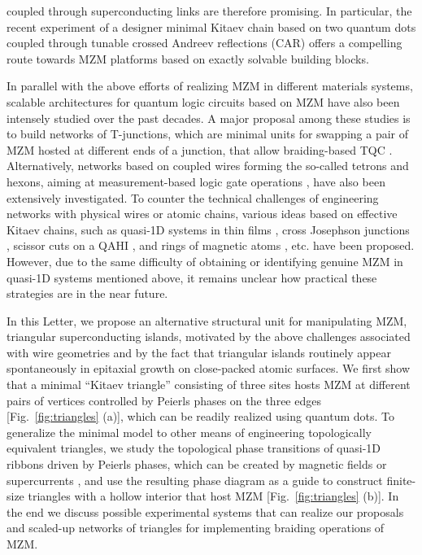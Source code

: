 \documentclass[aps,prb,showpacs,amsmath,twocolumn,amssymb,superscriptaddress]{revtex4-2}
\begin{document}
coupled through superconducting links \cite{sauRealizingRobustPractical2012,leijnseParityQubitsPoor2012,dvirRealizationMinimalKitaev2023} are therefore promising. In particular, the recent experiment \cite{dvirRealizationMinimalKitaev2023} of a designer minimal Kitaev chain based on two quantum dots coupled through tunable crossed Andreev reflections (CAR) offers a compelling route towards MZM platforms based on exactly solvable building blocks.

In parallel with the above efforts of realizing MZM in different materials systems, scalable architectures for quantum logic circuits based on MZM have also been intensely studied over the past decades. A major proposal among these studies is to build networks of T-junctions, which are minimal units for swapping a pair of MZM hosted at different ends of a junction, that allow braiding-based TQC \cite{aasenMilestonesMajoranaBasedQuantum2016}. Alternatively, networks based on coupled wires forming the so-called tetrons and hexons, aiming at measurement-based logic gate operations  \cite{karzigScalableDesignsQuasiparticlepoisoningprotected2017}, have also been extensively investigated. To counter the technical challenges of engineering networks with physical wires or atomic chains, various ideas based on effective Kitaev chains, such as quasi-1D systems in thin films \cite{potterMultichannelGeneralizationKitaev2010}, cross Josephson junctions \cite{zhouPhaseControlMajorana2020}, scissor cuts on a QAHI \cite{xieCreatingLocalizedMajorana2021}, and rings of magnetic atoms \cite{liManipulatingMajoranaZero2016}, etc. have been proposed. However, due to the same difficulty of obtaining or identifying genuine MZM in quasi-1D systems mentioned above, it remains unclear how practical these strategies are in the near future.

In this Letter, we propose an alternative structural unit for manipulating MZM, triangular superconducting islands, motivated by the above challenges associated with wire geometries and by the fact that triangular islands routinely appear spontaneously in epitaxial growth \cite{pietzschSpinResolvedElectronicStructure2006} on close-packed atomic surfaces. We first show that a minimal ``Kitaev triangle'' consisting of three sites hosts MZM at different pairs of vertices controlled by Peierls phases on the three edges [Fig.~\ref{fig:triangles} (a)], which can be readily realized using quantum dots. To generalize the minimal model to other means of engineering topologically equivalent triangles, we study the topological phase transitions of quasi-1D ribbons driven by Peierls phases, which can be created by magnetic fields or supercurrents \cite{romitoManipulatingMajoranaFermions2012, takasanSupercurrentinducedTopologicalPhase2022}, and use the resulting phase diagram as a guide to construct finite-size triangles with a hollow interior that host MZM  [Fig.~\ref{fig:triangles} (b)]. In the end we discuss possible experimental systems that can realize our proposals and scaled-up networks of triangles for implementing braiding operations of MZM.
\end{document}
